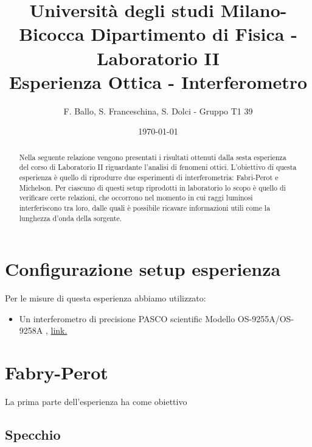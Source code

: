 \documentclass[letterpaper,12pt]{article}
\begin{document}
\title{{\small Università degli studi Milano-Bicocca  Dipartimento di Fisica - Laboratorio II }\\
	Esperienza Ottica - Interferometro}
\author{F. Ballo, S. Franceschina, S. Dolci - Gruppo T1 39}
\date{\today}
\maketitle
\thispagestyle{logoheader}


\begin{abstract}
	Nella seguente relazione vengono presentati i risultati ottenuti dalla sesta esperienza del corso di 
    Laboratorio II riguardante l'analisi di fenomeni ottici.
    L'obiettivo di questa esperienza è quello di riprodurre due esperimenti di interferometria: Fabri-Perot e Michelson.
    Per ciascuno di questi setup riprodotti in laboratorio lo scopo è quello di verificare certe relazioni, che occorrono
    nel momento in cui raggi luminosi interferiscono tra loro, dalle quali è possibile ricavare informazioni utili come 
    la lunghezza d'onda della sorgente.
	\begin{adjustwidth}{-1cm}{-1cm}
	\end{adjustwidth}
\end{abstract}
\tableofcontents
\newpage

\section{Configurazione setup esperienza}
Per le misure di questa esperienza abbiamo utilizzato:

\begin{itemize}
    \item Un interferometro di precisione PASCO scientific Modello OS-9255A/OS-9258A , \href{https://www.pasco.com/products/lab-apparatus/light-and-optics/advanced-optics/os-9255}{link.}
\end{itemize}


    
\section{Fabry-Perot}

La prima parte dell'esperienza ha come obiettivo 
\subsection{Specchio}
\end{document}
